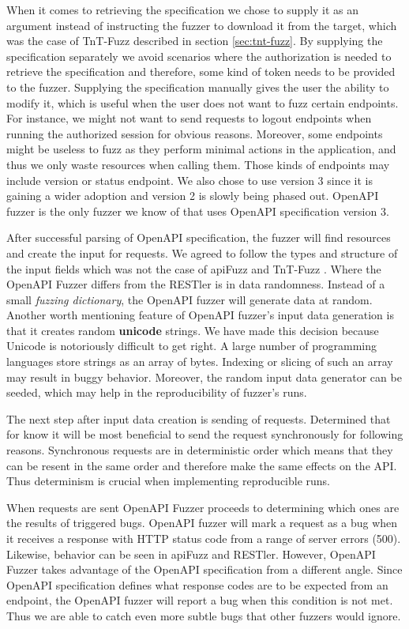 When it comes to retrieving the specification we chose to supply it as an argument instead of instructing the fuzzer to download it from the target, which was the case of TnT-Fuzz described in section \ref{sec:tnt-fuzz}. By supplying the specification separately we avoid scenarios where the authorization is needed to retrieve the specification and therefore, some kind of token needs to be provided to the fuzzer. Supplying the specification manually gives the user the ability to modify it, which is useful when the user does not want to fuzz certain endpoints. For instance, we might not want to send requests to logout endpoints when running the authorized session for obvious reasons. Moreover, some endpoints might be useless to fuzz as they perform minimal actions in the application, and thus we only waste resources when calling them. Those kinds of endpoints may include version or status endpoint. We also chose to use version 3 since it is gaining a wider adoption and version 2 is slowly being phased out. OpenAPI fuzzer is the only fuzzer we know of that uses OpenAPI specification version 3.

After successful parsing of OpenAPI specification, the fuzzer will find resources and create the input for requests. We agreed to follow the types and structure of the input fields which was not the case of apiFuzz \cite{apiFuzz2020github} and TnT-Fuzz \cite{tntFuzzer2020github}. Where the OpenAPI Fuzzer differs from the RESTler \cite{atlidakis2019restler} is in data randomness. Instead of a small \textit{fuzzing dictionary}, the OpenAPI fuzzer will generate data at random. Another worth mentioning feature of OpenAPI fuzzer's input data generation is that it creates random \textbf{unicode} strings. We have made this decision because Unicode is notoriously difficult to get right. A large number of programming languages store strings as an array of bytes. Indexing or slicing of such an array may result in buggy behavior. Moreover, the random input data generator can be seeded, which may help in the reproducibility of fuzzer's runs.

The next step after input data creation is sending of requests. Determined that for know it will be most beneficial to send the request synchronously for following reasons. Synchronous requests are in deterministic order which means that they can be resent in the same order and therefore make the same effects on the API. Thus determinism is crucial when implementing reproducible runs.

When requests are sent OpenAPI Fuzzer proceeds to determining which ones are the results of triggered bugs. OpenAPI fuzzer will mark a request as a bug when it receives a response with HTTP status code from a range of server errors (500). Likewise, behavior can be seen in apiFuzz and RESTler. However, OpenAPI Fuzzer takes advantage of the OpenAPI specification from a different angle. Since OpenAPI specification defines what response codes are to be expected from an endpoint, the OpenAPI fuzzer will report a bug when this condition is not met. Thus we are able to catch even more subtle bugs that other fuzzers would ignore.

